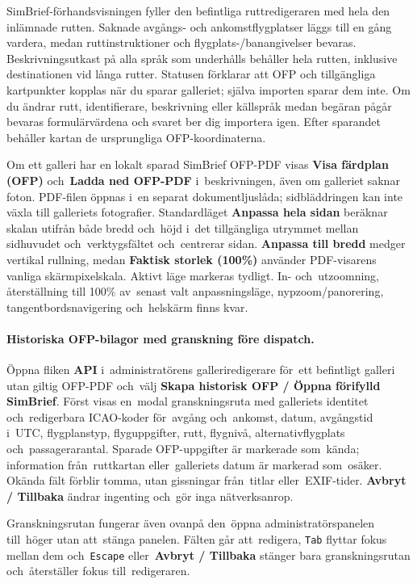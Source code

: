 \documentclass[11pt,a4paper]{article}
\newcommand{\ui}[1]{\textbf{#1}}
\newcommand{\codeword}[1]{\nolinkurl{#1}}
\begin{document}
SimBrief-förhandsvisningen fyller den befintliga ruttredigeraren med hela den
inlämnade rutten. Saknade avgångs- och ankomstflygplatser läggs till en gång
vardera, medan ruttinstruktioner och flygplats-/banangivelser bevaras.
Beskrivningsutkast på alla språk som underhålls behåller hela rutten, inklusive
destinationen vid långa rutter. Statusen förklarar att OFP och tillgängliga
kartpunkter kopplas när du sparar galleriet; själva importen sparar dem inte. Om
du ändrar rutt, identifierare, beskrivning eller källspråk medan begäran pågår
bevaras formulärvärdena och svaret ber dig importera igen. Efter sparandet
behåller kartan de ursprungliga OFP-koordinaterna.

Om ett galleri har en lokalt sparad SimBrief OFP-PDF visas \ui{Visa färdplan
(OFP)} och~\ui{Ladda ned OFP-PDF} i~beskrivningen, även om galleriet saknar
foton. PDF-filen öppnas i~en separat dokumentljuslåda; sidbläddringen kan inte
växla till galleriets fotografier. Standardläget \ui{Anpassa hela sidan}
beräknar skalan utifrån både bredd och~höjd i~det tillgängliga utrymmet mellan
sidhuvudet och~verktygsfältet och~centrerar sidan. \ui{Anpassa till bredd}
medger vertikal rullning, medan \ui{Faktisk storlek (100\%)} använder
PDF-visarens vanliga skärmpixelskala. Aktivt läge markeras tydligt. In-
och~utzoomning, återställning till 100\% av~senast valt anpassningsläge,
nypzoom/panorering, tangentbordsnavigering och~helskärm finns kvar.

\paragraph{Historiska OFP-bilagor med granskning före dispatch.}
Öppna fliken \ui{API} i~administratörens galleriredigerare för~ett befintligt
galleri utan giltig OFP-PDF och~välj \ui{Skapa historisk OFP / Öppna förifylld
SimBrief}. Först visas en~modal granskningsruta med galleriets identitet
och~redigerbara ICAO-koder för~avgång och~ankomst, datum, avgångstid i~UTC,
flygplanstyp, flyguppgifter, rutt, flygnivå, alternativflygplats
och~passagerarantal. Sparade OFP-uppgifter är markerade som~kända; information
från~ruttkartan eller~galleriets datum är markerad som~osäker. Okända fält
förblir tomma, utan gissningar från~titlar eller~EXIF-tider. \ui{Avbryt /
Tillbaka} ändrar ingenting och~gör inga nätverksanrop.

Granskningsrutan fungerar även ovanpå den~öppna administratörspanelen till~höger
utan att~stänga panelen. Fälten går att~redigera, \codeword{Tab} flyttar fokus
mellan dem och~\codeword{Escape} eller~\ui{Avbryt / Tillbaka} stänger bara
granskningsrutan och~återställer fokus till~redigeraren.
\end{document}

